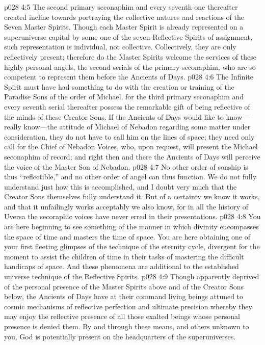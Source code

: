 \pc \vs p028 4:5 \bibnobreakspace {} The second primary seconaphim and every seventh one thereafter created incline towards portraying the collective natures and reactions of the Seven Master Spirits. Though each Master Spirit is already represented on a superuniverse capital by some one of the seven Reflective Spirits of assignment, such representation is individual, not collective. Collectively, they are only reflectively present; therefore do the Master Spirits welcome the services of these highly personal angels, the second serials of the primary seconaphim, who are so competent to represent them before the Ancients of Days.
\pc \vs p028 4:6 \bibnobreakspace {} The Infinite Spirit must have had something to do with the creation or training of the Paradise Sons of the order of Michael, for the third primary seconaphim and every seventh serial thereafter possess the remarkable gift of being reflective of the minds of these Creator Sons. If the Ancients of Days would like to know---really know---the attitude of Michael of Nebadon regarding some matter under consideration, they do not have to call him on the lines of space; they need only call for the Chief of Nebadon Voices, who, upon request, will present the Michael seconaphim of record; and right then and there the Ancients of Days will perceive the voice of the Master Son of Nebadon.
\vs p028 4:7 No other order of sonship is thus “reflectible,” and no other order of angel can thus function. We do not fully understand just how this is accomplished, and I doubt very much that the Creator Sons themselves fully understand it. But of a certainty we know it works, and that it unfailingly works acceptably we also know, for in all the history of Uversa the secoraphic voices have never erred in their presentations.
\vs p028 4:8 You are here beginning to see something of the manner in which divinity encompasses the space of time and masters the time of space. You are here obtaining one of your first fleeting glimpses of the technique of the eternity cycle, divergent for the moment to assist the children of time in their tasks of mastering the difficult handicaps of space. And these phenomena are additional to the established universe technique of the Reflective Spirits.
\vs p028 4:9 Though apparently deprived of the personal presence of the Master Spirits above and of the Creator Sons below, the Ancients of Days have at their command living beings attuned to cosmic mechanisms of reflective perfection and ultimate precision whereby they may enjoy the reflective presence of all those exalted beings whose personal presence is denied them. By and through these means, and others unknown to you, God is potentially present on the headquarters of the superuniverses.
